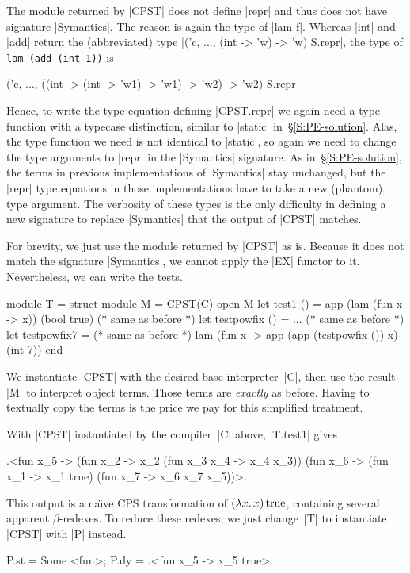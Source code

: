 The module returned by |CPST| does not define |repr|
and thus does not have signature |Symantics|.
The reason is again the type of |lam f|. Whereas
|int| and |add| return the (abbreviated) type
|('c, ..., (int -> 'w) -> 'w) S.repr|,
the type of \texttt{lam (add (int~1))} is
\begin{code}
('c, ..., ((int -> (int -> 'w1) -> 'w1) -> 'w2) -> 'w2) S.repr
\end{code}
Hence, to write the type equation defining |CPST.repr| we again need
a type function with a typecase distinction, similar to |static|
in~\S\ref{S:PE-solution}. Alas, the type function we need is not
identical to |static|, so again we need to change the type arguments to
|repr| in the |Symantics| signature. As in~\S\ref{S:PE-solution}, the
terms in previous implementations of |Symantics| stay unchanged, but the
|repr| type equations in those implementations have to take a new
(phantom) type argument.
The verbosity of these types is the only difficulty in defining a
new signature to replace |Symantics| that the output of |CPST| matches.

For brevity, we just
use the module returned by |CPST| as is. Because it does not
match the signature |Symantics|, we cannot apply the |EX| functor to it.
Nevertheless, we can write the tests.
\begin{code}
module T = struct
  module M = CPST(C)
  open M
  let test1 () =
       app (lam (fun x -> x)) (bool true)  (* same as before *)
  let testpowfix () = ...                  (* same as before *)
  let testpowfix7 =                        (* same as before *)
       lam (fun x -> app (app (testpowfix ()) x) (int 7))
end
\end{code}
We instantiate |CPST| with the desired base interpreter~|C|,
then use the result |M| to
interpret object terms. Those terms are \emph{exactly} as before.
Having to textually copy the terms is the
price we pay for this simplified treatment.
\begin{comment}
Our discussion of self\hyp interpretation in~\S\ref{selfinterp} shows
that this copying is not frivolous but represents plugging a term into
a context, which is one of the many faces of polymorphism.
\end{comment}

With 
|CPST| instantiated by the compiler~|C| above,
|T.test1| gives
\begin{code}
.<fun x_5 -> (fun x_2 -> x_2 (fun x_3 x_4 -> x_4 x_3))
             (fun x_6 -> (fun x_1 -> x_1 true)
                         (fun x_7 -> x_6 x_7 x_5))>.
\end{code}
This output is a na\"{\i}ve CPS transformation of $(\mathopen{\lambda\mathord{x}.\,}x)\mathinner{\mathrm{true}}$,
containing several apparent $\beta$-redexes.  To reduce these
redexes, we just change~|T| to instantiate |CPST| with |P| instead.
\begin{code}
{P.st = Some <fun>; P.dy = .<fun x_5 -> x_5 true>.}
\end{code}

